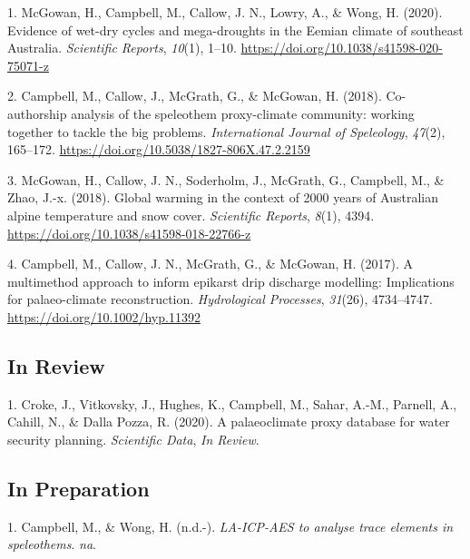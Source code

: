 \documentclass[11pt,a4paper,]{moderncv}
\begin{document}
\hypertarget{bibliography}{}
\leavevmode\hypertarget{ref-mcgowan_evidence_2020}{}%
1. McGowan, H., Campbell, M., Callow, J. N., Lowry, A., \& Wong, H.
(2020). Evidence of wet-dry cycles and mega-droughts in the Eemian
climate of southeast Australia. \emph{Scientific Reports}, \emph{10}(1),
1--10. \url{https://doi.org/10.1038/s41598-020-75071-z}

\leavevmode\hypertarget{ref-Campbell2018}{}%
2. Campbell, M., Callow, J., McGrath, G., \& McGowan, H. (2018).
Co-authorship analysis of the speleothem proxy-climate community:
working together to tackle the big problems. \emph{International Journal
of Speleology}, \emph{47}(2), 165--172.
\url{https://doi.org/10.5038/1827-806X.47.2.2159}

\leavevmode\hypertarget{ref-McGowan2018}{}%
3. McGowan, H., Callow, J. N., Soderholm, J., McGrath, G., Campbell, M.,
\& Zhao, J.-x. (2018). Global warming in the context of 2000 years of
Australian alpine temperature and snow cover. \emph{Scientific Reports},
\emph{8}(1), 4394. \url{https://doi.org/10.1038/s41598-018-22766-z}

\leavevmode\hypertarget{ref-Campbell2017}{}%
4. Campbell, M., Callow, J. N., McGrath, G., \& McGowan, H. (2017). A
multimethod approach to inform epikarst drip discharge modelling:
Implications for palaeo-climate reconstruction. \emph{Hydrological
Processes}, \emph{31}(26), 4734--4747.
\url{https://doi.org/10.1002/hyp.11392}

\hypertarget{in-review}{%
\subsection{In Review}\label{in-review}}

\hypertarget{bibliography}{}
\leavevmode\hypertarget{ref-Croke2020}{}%
1. Croke, J., Vitkovsky, J., Hughes, K., Campbell, M., Sahar, A.-M.,
Parnell, A., Cahill, N., \& Dalla Pozza, R. (2020). A palaeoclimate
proxy database for water security planning. \emph{Scientific Data},
\emph{In Review}.

\hypertarget{in-preparation}{%
\subsection{In Preparation}\label{in-preparation}}

\hypertarget{bibliography}{}
\leavevmode\hypertarget{ref-Campbell2020}{}%
1. Campbell, M., \& Wong, H. (n.d.-). \emph{LA-ICP-AES to analyse trace
elements in speleothems}. \emph{na}.
\end{document}
